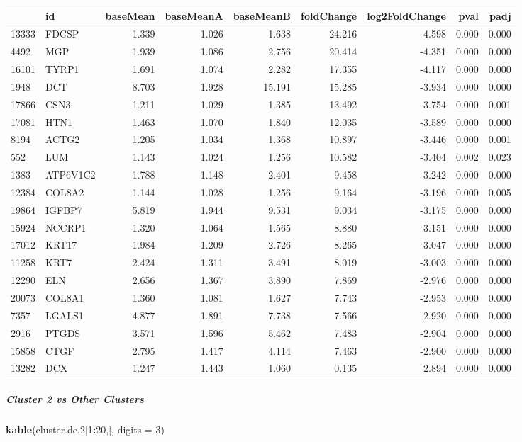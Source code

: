 \documentclass[]{article}
\newenvironment{Shaded}{\begin{snugshade}}{\end{snugshade}}
\newcommand{\DataTypeTok}[1]{\textcolor[rgb]{0.13,0.29,0.53}{#1}}
\newcommand{\DecValTok}[1]{\textcolor[rgb]{0.00,0.00,0.81}{#1}}
\newcommand{\FloatTok}[1]{\textcolor[rgb]{0.00,0.00,0.81}{#1}}
\newcommand{\KeywordTok}[1]{\textcolor[rgb]{0.13,0.29,0.53}{\textbf{#1}}}
\newcommand{\NormalTok}[1]{#1}
\newcommand{\OperatorTok}[1]{\textcolor[rgb]{0.81,0.36,0.00}{\textbf{#1}}}
\let\oldsubparagraph\subparagraph
\renewcommand{\subparagraph}[1]{\oldsubparagraph{#1}\mbox{}}
\begin{document}
\begin{longtable}[]{@{}llrrrrrrr@{}}
\toprule
& id & baseMean & baseMeanA & baseMeanB & foldChange & log2FoldChange &
pval & padj\tabularnewline
\midrule
\endhead
13333 & FDCSP & 1.339 & 1.026 & 1.638 & 24.216 & -4.598 & 0.000 &
0.000\tabularnewline
4492 & MGP & 1.939 & 1.086 & 2.756 & 20.414 & -4.351 & 0.000 &
0.000\tabularnewline
16101 & TYRP1 & 1.691 & 1.074 & 2.282 & 17.355 & -4.117 & 0.000 &
0.000\tabularnewline
1948 & DCT & 8.703 & 1.928 & 15.191 & 15.285 & -3.934 & 0.000 &
0.000\tabularnewline
17866 & CSN3 & 1.211 & 1.029 & 1.385 & 13.492 & -3.754 & 0.000 &
0.001\tabularnewline
17081 & HTN1 & 1.463 & 1.070 & 1.840 & 12.035 & -3.589 & 0.000 &
0.000\tabularnewline
8194 & ACTG2 & 1.205 & 1.034 & 1.368 & 10.897 & -3.446 & 0.000 &
0.001\tabularnewline
552 & LUM & 1.143 & 1.024 & 1.256 & 10.582 & -3.404 & 0.002 &
0.023\tabularnewline
1383 & ATP6V1C2 & 1.788 & 1.148 & 2.401 & 9.458 & -3.242 & 0.000 &
0.000\tabularnewline
12384 & COL8A2 & 1.144 & 1.028 & 1.256 & 9.164 & -3.196 & 0.000 &
0.005\tabularnewline
19864 & IGFBP7 & 5.819 & 1.944 & 9.531 & 9.034 & -3.175 & 0.000 &
0.000\tabularnewline
15924 & NCCRP1 & 1.320 & 1.064 & 1.565 & 8.880 & -3.151 & 0.000 &
0.000\tabularnewline
17012 & KRT17 & 1.984 & 1.209 & 2.726 & 8.265 & -3.047 & 0.000 &
0.000\tabularnewline
11258 & KRT7 & 2.424 & 1.311 & 3.491 & 8.019 & -3.003 & 0.000 &
0.000\tabularnewline
12290 & ELN & 2.656 & 1.367 & 3.890 & 7.869 & -2.976 & 0.000 &
0.000\tabularnewline
20073 & COL8A1 & 1.360 & 1.081 & 1.627 & 7.743 & -2.953 & 0.000 &
0.000\tabularnewline
7357 & LGALS1 & 4.877 & 1.891 & 7.738 & 7.566 & -2.920 & 0.000 &
0.000\tabularnewline
2916 & PTGDS & 3.571 & 1.596 & 5.462 & 7.483 & -2.904 & 0.000 &
0.000\tabularnewline
15858 & CTGF & 2.795 & 1.417 & 4.114 & 7.463 & -2.900 & 0.000 &
0.000\tabularnewline
13282 & DCX & 1.247 & 1.443 & 1.060 & 0.135 & 2.894 & 0.000 &
0.000\tabularnewline
\bottomrule
\end{longtable}

\hypertarget{cluster-2-vs-other-clusters}{%
\subparagraph{Cluster 2 vs Other
Clusters}\label{cluster-2-vs-other-clusters}}

\begin{Shaded}
\begin{Highlighting}[]
\KeywordTok{kable}\NormalTok{(cluster.de}\FloatTok{.2}\NormalTok{[}\DecValTok{1}\OperatorTok{:}\DecValTok{20}\NormalTok{,], }\DataTypeTok{digits =} \DecValTok{3}\NormalTok{)}
\end{Highlighting}
\end{Shaded}
\end{document}
